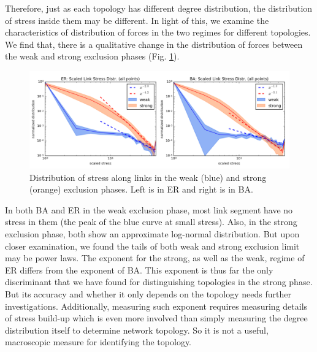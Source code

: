 \documentclass[nofootinbib,preprint,floatfix,endfloats]{revtex4} %
\begin{document}
Therefore, just as each topology has different degree distribution, the distribution of stress inside them may be different. 
In light of this, we examine the characteristics of distribution of forces in the two regimes for different topologies. 
We find that, there is a qualitative change in the distribution of forces between the weak and strong exclusion phases (Fig. \ref{fig:Tdist}). 
\begin{figure}
    \centering
    \includegraphics[width=1\columnwidth]{fig-09-19/stress-dist.png}
    \caption{Distribution of stress along links in the weak (blue) and strong (orange) exclusion phases. Left is in ER and right is in BA. }
    \label{fig:Tdist}
\end{figure}
In both BA and ER in the weak exclusion phase, most link segment have no stress in them (the peak of the blue curve at small stress).
Also, in the strong exclusion phase, both show an approximate log-normal distribution. 
But upon closer examination, we found the tails of both weak and strong exclusion limit may be power laws. The exponent for the strong, as well as the weak, regime of ER differs from the exponent of BA. 
This exponent is thus far the only discriminant that we have found for distinguishing topologies in the strong phase. 
But its accuracy and whether it only depends on the topology needs further investigations. 
Additionally, measuring such exponent requires measuring details of stress build-up which is even more involved than simply measuring the degree distribution itself to determine network topology. 
So it is not a useful, macroscopic measure for identifying the topology.
\end{document}

